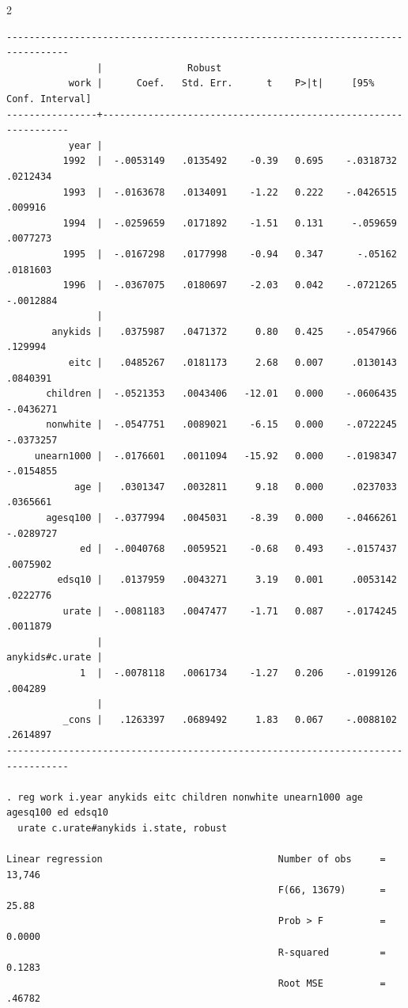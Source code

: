 \documentclass{article}
\newenvironment{changemargin}[2]{%
\begin{list}{}{%
\setlength{\topsep}{0pt}%
\setlength{\leftmargin}{#1}%
\setlength{\rightmargin}{#2}%
\setlength{\listparindent}{\parindent}%
\setlength{\itemindent}{\parindent}%
\setlength{\parsep}{\parskip}%
}%
\item[]}{\end{list}}
\begin{document}
\begin{changemargin}{-0.5in}{-0.5in}
\begin{multicols}{2}
\begin{verbatim}
---------------------------------------------------------------------------------
                |               Robust
           work |      Coef.   Std. Err.      t    P>|t|     [95% Conf. Interval]
----------------+----------------------------------------------------------------
           year |
          1992  |  -.0053149   .0135492    -0.39   0.695    -.0318732    .0212434
          1993  |  -.0163678   .0134091    -1.22   0.222    -.0426515     .009916
          1994  |  -.0259659   .0171892    -1.51   0.131     -.059659    .0077273
          1995  |  -.0167298   .0177998    -0.94   0.347      -.05162    .0181603
          1996  |  -.0367075   .0180697    -2.03   0.042    -.0721265   -.0012884
                |
        anykids |   .0375987   .0471372     0.80   0.425    -.0547966     .129994
           eitc |   .0485267   .0181173     2.68   0.007     .0130143    .0840391
       children |  -.0521353   .0043406   -12.01   0.000    -.0606435   -.0436271
       nonwhite |  -.0547751   .0089021    -6.15   0.000    -.0722245   -.0373257
     unearn1000 |  -.0176601   .0011094   -15.92   0.000    -.0198347   -.0154855
            age |   .0301347   .0032811     9.18   0.000     .0237033    .0365661
       agesq100 |  -.0377994   .0045031    -8.39   0.000    -.0466261   -.0289727
             ed |  -.0040768   .0059521    -0.68   0.493    -.0157437    .0075902
         edsq10 |   .0137959   .0043271     3.19   0.001     .0053142    .0222776
          urate |  -.0081183   .0047477    -1.71   0.087    -.0174245    .0011879
                |
anykids#c.urate |
             1  |  -.0078118   .0061734    -1.27   0.206    -.0199126     .004289
                |
          _cons |   .1263397   .0689492     1.83   0.067    -.0088102    .2614897
---------------------------------------------------------------------------------

. reg work i.year anykids eitc children nonwhite unearn1000 age agesq100 ed edsq10 
  urate c.urate#anykids i.state, robust

Linear regression                               Number of obs     =     13,746
                                                F(66, 13679)      =      25.88
                                                Prob > F          =     0.0000
                                                R-squared         =     0.1283
                                                Root MSE          =     .46782


\end{verbatim}
\end{multicols}
\end{changemargin}
\end{document}
